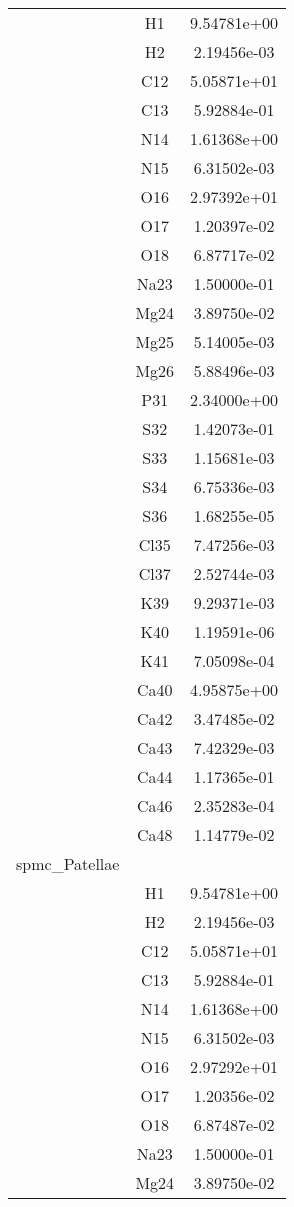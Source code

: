 \begin{centering}
\begin{longtable}{l c c}
\hline
& H1 & 9.54781e+00 \\ 
& H2 & 2.19456e-03 \\ 
& C12 & 5.05871e+01 \\ 
& C13 & 5.92884e-01 \\ 
& N14 & 1.61368e+00 \\ 
& N15 & 6.31502e-03 \\ 
& O16 & 2.97392e+01 \\ 
& O17 & 1.20397e-02 \\ 
& O18 & 6.87717e-02 \\ 
& Na23 & 1.50000e-01 \\ 
& Mg24 & 3.89750e-02 \\ 
& Mg25 & 5.14005e-03 \\ 
& Mg26 & 5.88496e-03 \\ 
& P31 & 2.34000e+00 \\ 
& S32 & 1.42073e-01 \\ 
& S33 & 1.15681e-03 \\ 
& S34 & 6.75336e-03 \\ 
& S36 & 1.68255e-05 \\ 
& Cl35 & 7.47256e-03 \\ 
& Cl37 & 2.52744e-03 \\ 
& K39 & 9.29371e-03 \\ 
& K40 & 1.19591e-06 \\ 
& K41 & 7.05098e-04 \\ 
& Ca40 & 4.95875e+00 \\ 
& Ca42 & 3.47485e-02 \\ 
& Ca43 & 7.42329e-03 \\ 
& Ca44 & 1.17365e-01 \\ 
& Ca46 & 2.35283e-04 \\ 
& Ca48 & 1.14779e-02 \\ 
\hline
spmc_Patellae & & \\
\hline
& H1 & 9.54781e+00 \\ 
& H2 & 2.19456e-03 \\ 
& C12 & 5.05871e+01 \\ 
& C13 & 5.92884e-01 \\ 
& N14 & 1.61368e+00 \\ 
& N15 & 6.31502e-03 \\ 
& O16 & 2.97292e+01 \\ 
& O17 & 1.20356e-02 \\ 
& O18 & 6.87487e-02 \\ 
& Na23 & 1.50000e-01 \\ 
& Mg24 & 3.89750e-02 \\ 

\end{longtable}
\end{centering}
